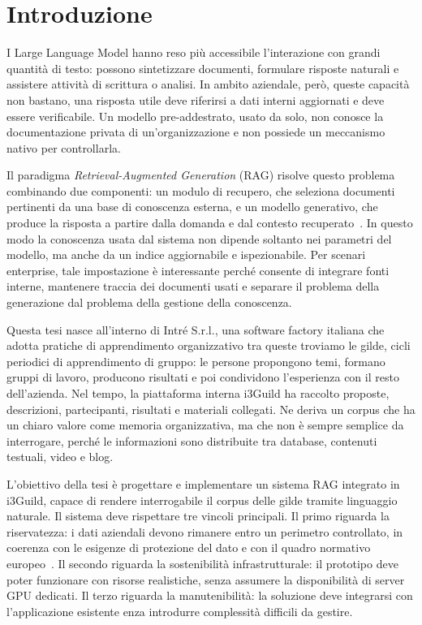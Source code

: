 \chapter*{Introduzione}

I Large Language Model hanno reso più accessibile l'interazione con grandi
quantità di testo: possono sintetizzare documenti, formulare risposte naturali
e assistere attività di scrittura o analisi. In ambito
aziendale, però, queste capacità non bastano, una risposta utile deve riferirsi
a dati interni aggiornati e deve essere verificabile. Un modello
pre-addestrato, usato da solo, non conosce la documentazione privata di
un'organizzazione e non possiede un meccanismo nativo per controllarla.

Il paradigma \emph{Retrieval-Augmented Generation} (RAG) risolve questo
problema combinando due componenti: un modulo di recupero, che seleziona
documenti pertinenti da una base di conoscenza esterna, e un modello
generativo, che produce la risposta a partire dalla domanda e dal contesto
recuperato~\cite{lewis2020retrieval}. In questo modo la conoscenza usata dal sistema
non dipende soltanto nei parametri del modello, ma anche da un indice
aggiornabile e ispezionabile. Per scenari enterprise, tale impostazione è
interessante perché consente di integrare fonti interne, mantenere traccia dei
documenti usati e separare il problema della generazione dal problema della
gestione della conoscenza.

Questa tesi nasce all'interno di Intré S.r.l., una software factory italiana che adotta pratiche 
di apprendimento organizzativo tra queste troviamo le gilde, cicli periodici di apprendimento di gruppo: 
le persone propongono temi, formano gruppi di lavoro, producono risultati e poi condividono l'esperienza con il 
resto dell'azienda. Nel tempo, la piattaforma interna i3Guild ha raccolto proposte, descrizioni, partecipanti, 
risultati e materiali collegati. Ne deriva un corpus che ha un chiaro valore come memoria organizzativa, ma che 
non è sempre semplice da interrogare, perché le informazioni sono distribuite tra database, contenuti testuali, video e blog.

L'obiettivo della tesi è progettare e implementare un sistema RAG integrato in i3Guild, capace di rendere 
interrogabile il corpus delle gilde tramite linguaggio naturale. Il sistema deve rispettare tre vincoli principali. 
Il primo riguarda la riservatezza: i dati aziendali devono rimanere entro un perimetro controllato, in coerenza con 
le esigenze di protezione del dato e con il quadro normativo europeo~\cite{gdpr2016}. Il secondo riguarda la sostenibilità 
infrastrutturale: il prototipo deve poter funzionare con risorse realistiche, senza assumere la disponibilità di 
server GPU dedicati. Il terzo riguarda la manutenibilità: la soluzione deve integrarsi con l'applicazione esistente 
enza introdurre complessità difficili da gestire.

